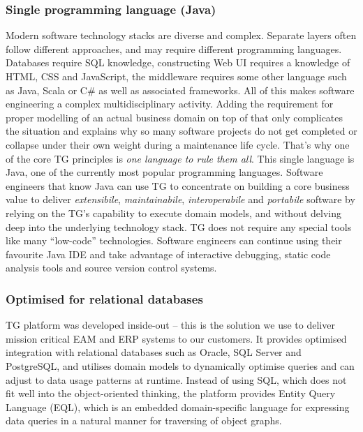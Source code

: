 \documentclass[a4paper,10pt,twocolumn,oneside,openright,final]{memoir}
\begin{document}
\subsubsection*{Single programming language (Java)}
	Modern software technology stacks are diverse and complex.
	Separate layers often follow different approaches, and may require different programming languages.
	Databases require SQL knowledge, constructing Web UI requires a knowledge of HTML, CSS and JavaScript, the middleware requires some other language such as Java, Scala or C\# as well as associated frameworks.
	All of this makes software engineering a complex multidisciplinary activity.
	Adding the requirement for proper modelling of an actual business domain on top of that only complicates the situation and explains why so many software projects do not get completed or collapse under their own weight during a maintenance life cycle.
	That's why one of the core TG principles is \emph{one language to rule them all}.
	This single language is Java, one of the currently most popular programming languages.
	Software engineers that know Java can use TG to concentrate on building a core business value to deliver \emph{extensibile}, \emph{maintainabile}, \emph{interoperabile} and \emph{portabile} software by relying on the TG's capability to execute domain models, and without delving deep into the underlying technology stack.
	TG does not require any special tools like many ``low-code'' technologies.
	Software engineers can continue using their favourite Java IDE and take advantage of interactive debugging, static code analysis tools and source version control systems.

\subsubsection*{Optimised for relational databases}
	TG platform was developed inside-out -- this is the solution we use to deliver mission critical EAM and ERP systems to our customers.
	It provides optimised integration with relational databases such as Oracle, SQL Server and PostgreSQL, and utilises domain models to dynamically optimise queries and can adjust to data usage patterns at runtime.
	Instead of using SQL, which does not fit well into the object-oriented thinking, the platform provides Entity Query Language (EQL), which is an embedded domain-specific language for expressing data queries in a natural manner for traversing of object graphs.
\end{document}

